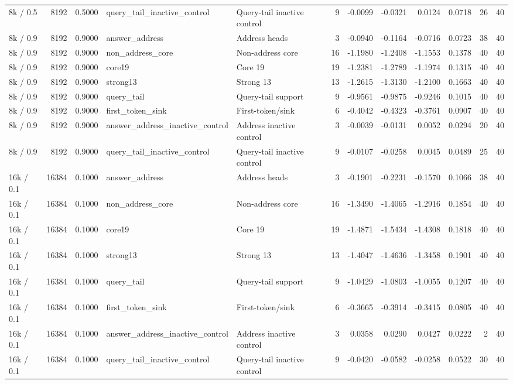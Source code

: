 \begin{tabular}{lrrllrrrrrrr}
8k / 0.5 & 8192 & 0.5000 & query_tail_inactive_control & Query-tail inactive control & 9 & -0.0099 & -0.0321 & 0.0124 & 0.0718 & 26 & 40 \\
8k / 0.9 & 8192 & 0.9000 & answer_address & Address heads & 3 & -0.0940 & -0.1164 & -0.0716 & 0.0723 & 38 & 40 \\
8k / 0.9 & 8192 & 0.9000 & non_address_core & Non-address core & 16 & -1.1980 & -1.2408 & -1.1553 & 0.1378 & 40 & 40 \\
8k / 0.9 & 8192 & 0.9000 & core19 & Core 19 & 19 & -1.2381 & -1.2789 & -1.1974 & 0.1315 & 40 & 40 \\
8k / 0.9 & 8192 & 0.9000 & strong13 & Strong 13 & 13 & -1.2615 & -1.3130 & -1.2100 & 0.1663 & 40 & 40 \\
8k / 0.9 & 8192 & 0.9000 & query_tail & Query-tail support & 9 & -0.9561 & -0.9875 & -0.9246 & 0.1015 & 40 & 40 \\
8k / 0.9 & 8192 & 0.9000 & first_token_sink & First-token/sink & 6 & -0.4042 & -0.4323 & -0.3761 & 0.0907 & 40 & 40 \\
8k / 0.9 & 8192 & 0.9000 & answer_address_inactive_control & Address inactive control & 3 & -0.0039 & -0.0131 & 0.0052 & 0.0294 & 20 & 40 \\
8k / 0.9 & 8192 & 0.9000 & query_tail_inactive_control & Query-tail inactive control & 9 & -0.0107 & -0.0258 & 0.0045 & 0.0489 & 25 & 40 \\
16k / 0.1 & 16384 & 0.1000 & answer_address & Address heads & 3 & -0.1901 & -0.2231 & -0.1570 & 0.1066 & 38 & 40 \\
16k / 0.1 & 16384 & 0.1000 & non_address_core & Non-address core & 16 & -1.3490 & -1.4065 & -1.2916 & 0.1854 & 40 & 40 \\
16k / 0.1 & 16384 & 0.1000 & core19 & Core 19 & 19 & -1.4871 & -1.5434 & -1.4308 & 0.1818 & 40 & 40 \\
16k / 0.1 & 16384 & 0.1000 & strong13 & Strong 13 & 13 & -1.4047 & -1.4636 & -1.3458 & 0.1901 & 40 & 40 \\
16k / 0.1 & 16384 & 0.1000 & query_tail & Query-tail support & 9 & -1.0429 & -1.0803 & -1.0055 & 0.1207 & 40 & 40 \\
16k / 0.1 & 16384 & 0.1000 & first_token_sink & First-token/sink & 6 & -0.3665 & -0.3914 & -0.3415 & 0.0805 & 40 & 40 \\
16k / 0.1 & 16384 & 0.1000 & answer_address_inactive_control & Address inactive control & 3 & 0.0358 & 0.0290 & 0.0427 & 0.0222 & 2 & 40 \\
16k / 0.1 & 16384 & 0.1000 & query_tail_inactive_control & Query-tail inactive control & 9 & -0.0420 & -0.0582 & -0.0258 & 0.0522 & 30 & 40 \\

\end{tabular}
